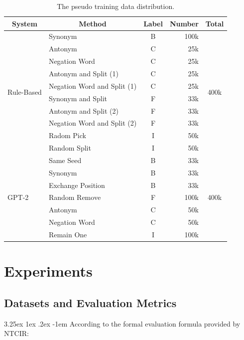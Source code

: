 \documentclass[12pt]{article}
\makeatletter
\renewcommand\paragraph{\@startsection{paragraph}{5}{\z@}%
  {3.25ex \@plus1ex \@minus.2ex}%
  {-1em}%
  {\normalfont\normalsize\bfseries}}
\makeatother
\begin{document}
\begin{CJK*}{UTF8}{bkai}
\begin{spacing}{1.77}
\begin{table}[H]
  \centering
  \setlength{\extrarowheight}{-3pt}
  \begin{tabular}{|l|l|c|r|c|}
  \hline
  \multicolumn{1}{|c|}{System} & \multicolumn{1}{c|}{Method} & Label & \multicolumn{1}{c|}{Number} & Total \\ \hline
  \multirow{10}{*}{Rule-Based} & Synonym & B & 100k & \multirow{10}{*}{400k} \\ \cline{2-4}
   & Antonym & C & 25k &  \\ \cline{2-4}
   & Negation Word & C & 25k &  \\ \cline{2-4}
   & Antonym and Split (1) & C & 25k &  \\ \cline{2-4}
   & Negation Word and Split (1) & C & 25k &  \\ \cline{2-4}
   & Synonym and Split & F & 33k &  \\ \cline{2-4}
   & Antonym and Split (2) & F & 33k &  \\ \cline{2-4}
   & Negation Word and Split (2) & F & 33k &  \\ \cline{2-4}
   & Radom Pick & I & 50k &  \\ \cline{2-4}
   & Random Split & I & 50k &  \\ \hline
  \multirow{7}{*}{GPT-2} & Same Seed & B & 33k & \multirow{7}{*}{400k} \\ \cline{2-4}
   & Synonym & B & 33k &  \\ \cline{2-4}
   & Exchange Position & B & 33k &  \\ \cline{2-4}
   & Random Remove & F & 100k &  \\ \cline{2-4}
   & Antonym & C & 50k &  \\ \cline{2-4}
   & Negation Word & C & 50k &  \\ \cline{2-4}
   & Remain One & I & 100k &  \\ \hline
  \end{tabular}
  \caption{The pseudo training data distribution.}
  \label{table:pseudo_training_data_dist}
\end{table}

\section{Experiments} \label{section:experiments}
\subsection{Datasets and Evaluation Metrics}
\paragraph{}
According to the formal evaluation formula provided by NTCIR:


\end{spacing}
\end{CJK*}
\end{document}
